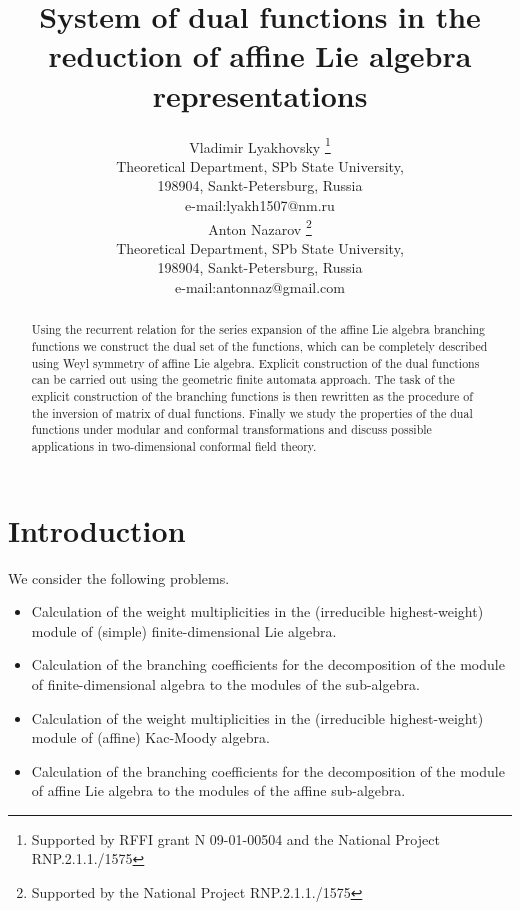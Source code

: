 \documentclass[a4paper,12pt]{article}
\theoremstyle{definition}
\theoremstyle{definition}
\theoremstyle{definition}
\begin{document}
\title{\textbf{{\Large {System of dual functions in the reduction of affine Lie algebra representations}}}}
\author{Vladimir Lyakhovsky \thanks{ Supported by
 RFFI grant N 09-01-00504 and the National Project RNP.2.1.1./1575 }\\
Theoretical Department, SPb State University,\\
198904, Sankt-Petersburg, Russia \\
e-mail:lyakh1507@nm.ru \\
[5mm] Anton Nazarov \thanks{ Supported by
the National Project RNP.2.1.1./1575 }\\
Theoretical Department, SPb State University,\\
198904, Sankt-Petersburg, Russia \\
e-mail:antonnaz@gmail.com
}
\maketitle

\begin{abstract}
  Using the recurrent relation for the series expansion of the affine Lie algebra branching functions we construct the dual set of the functions, which can be completely described using Weyl symmetry of affine Lie algebra. Explicit construction of the dual functions can be carried out using the geometric finite automata approach. The task of the explicit construction of the branching functions is then rewritten as the procedure of the inversion of matrix of dual functions. Finally we study the properties of the dual functions under modular and conformal transformations and discuss possible applications in two-dimensional conformal field theory.
\end{abstract}

\section{Introduction}
\label{sec:introduction}

We consider the following problems.
\begin{itemize}
\item Calculation of the weight multiplicities in the (irreducible highest-weight) module of (simple) finite-dimensional Lie algebra.
\item Calculation of the branching coefficients for the decomposition of the module of finite-dimensional algebra to the modules of the sub-algebra.
\item Calculation of the weight multiplicities in the (irreducible highest-weight) module of (affine) Kac-Moody algebra.
\item Calculation of the branching coefficients for the decomposition of the module of affine Lie algebra to the modules of the affine sub-algebra.
\end{itemize}
\end{document}
